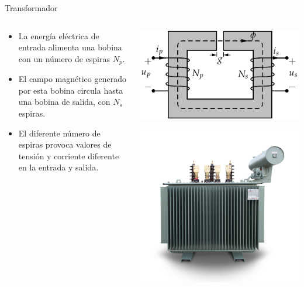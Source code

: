\documentclass[xcolor={usenames,svgnames,dvipsnames}]{beamer}
\begin{document}
\begin{frame}[label={sec:org2cecff0}]{Transformador}
\begin{columns}
\begin{column}{0.6\columnwidth}
\begin{itemize}
\item La energía eléctrica de entrada alimenta una bobina con un número de espiras \(N_p\).
\item El campo magnético generado por esta bobina circula hasta una bobina de salida, con \(N_s\) espiras.
\item El diferente número de espiras provoca valores de tensión y corriente diferente en la entrada y salida.
\end{itemize}
\end{column}

\begin{column}{0.4\columnwidth}
\begin{center}
\includegraphics[width=.9\linewidth]{../figs/Transformador2.pdf}
\end{center}
\begin{center}
\includegraphics[width=.9\linewidth]{../figs/Transformador.png}
\end{center}
\end{column}
\end{columns}
\end{frame}
\end{document}
